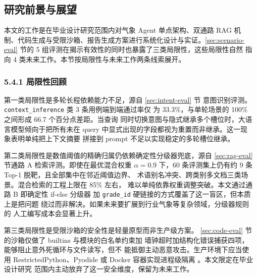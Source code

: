 
\subsection{研究前景与展望}
\label{sec:future-work}

本文的工作是在毕业设计研究范围内对气象 Agent 单点架构、双通路 RAG
机制、代码生成与受限沙箱、报告生成方案进行系统化设计与实证。\ref{sec:scenario-eval}
节的 5 组评测在揭示有效性的同时也暴露了三类局限性，这些局限性自然
指向 4 类未来工作。本节按局限性与未来工作两条线索展开。

\subsubsection*{5.4.1 \quad 局限性回顾}

第一类局限性是多轮长程依赖能力不足，源自 \ref{sec:intent-eval} 节
意图识别评测。\texttt{context\_\bk{}inference} 类 3 条用例端到端通过率仅
为 33.3\%，与单轮场景的 100\% 之间形成 66.7 个百分点差距。当查询
同时切换意图与隐式继承多个槽位时，大语言模型倾向于把所有未在 query
中显式出现的字段都视为重置而非继承。这一现象表明单纯把上下文摘要
拼接到 prompt 不足以实现稳定的多轮槽位继承。

第二类局限性是数值阈值的精确归属仍依赖确定性分级器兜底，源自
\ref{sec:rag-eval} 节通路 A 检索评测。即使在最优混合权重 $\alpha=0.9$
下，60 条评测集上仍有约 9 条 Top-1 脱靶，且全部集中在邻近阈值边界、
术语别名冲突、跨类别多文档三类场景。混合检索的工程上限在 85\% 左右，
难以单纯依靠权重调整突破。本文通过通路 B 即确定性 if-else 分级器
加 \texttt{grade\_\bk{}id} 硬链接的方式覆盖了这一盲区，但本质上是把问题
绕过而非解决。如果未来要扩展到行业气象等复杂领域，分级器规则的
人工编写成本会显著上升。

第三类局限性是受限沙箱的安全性是轻量原型而非生产级方案。
\ref{sec:code-eval} 节的沙箱仅做了 builtins 与模块的白名单约束加
墙钟超时加结构化错误捕获四项，能够阻止意外死循环与文件读写，但不
能抵御主动恶意攻击。生产环境下应当使用 RestrictedPython、Pyodide
或 Docker 容器实现进程级隔离 \cite{ref23}。本文限定在毕业设计研究
范围内主动放弃了这一安全维度，保留为未来工作。

